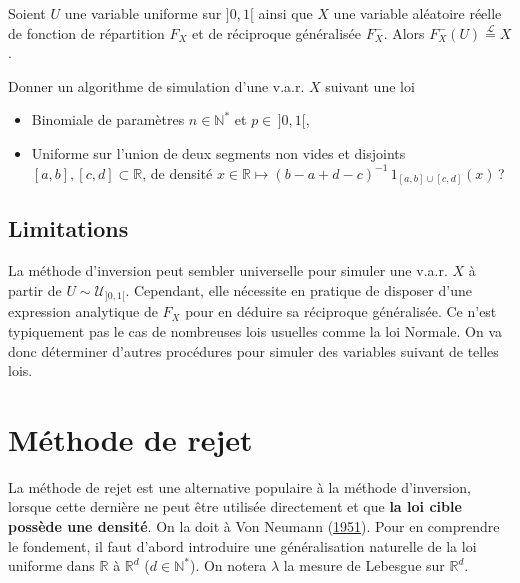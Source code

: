 \begin{theoreme}\label{V-invgen}

Soient \(U\) une variable uniforme sur \(]0,1[\) ainsi que \(X\) une
variable aléatoire réelle de fonction de répartition \(F_X\) et de
réciproque généralisée \(F_X^-\). Alors
\(F_X^-(U) \overset{\mathcal{L}}{=} X\).
\end{theoreme}

\label{V-exemples2}
Donner un algorithme de simulation d'une v.a.r. \(X\) suivant une loi

\begin{itemize}
\tightlist
\item
  Binomiale de paramètres \(n\in\mathbb{N}^\ast\) et \(p \in\, ]0,1[\),
\item
  Uniforme sur l'union de deux segments non vides et disjoints
  \([a,b], [c,d]\subset\mathbb{R}\), de densité
  \(x\in\mathbb{R}\mapsto (b-a + d-c)^{-1}\,1_{[a,b]\cup[c,d]}(x)\)\,?
\end{itemize}


\subsection{Limitations}\label{V-limitations}

La méthode d'inversion peut sembler universelle pour simuler une v.a.r.
\(X\) à partir de \(U \sim \mathcal{U}_{]0,1[}\). Cependant, elle
nécessite en pratique de disposer d'une expression analytique de \(F_X\)
pour en déduire sa réciproque généralisée. Ce n'est typiquement pas le
cas de nombreuses lois usuelles comme la loi Normale. On va donc
déterminer d'autres procédures pour simuler des variables suivant de
telles lois.

\section{Méthode de rejet}\label{V-muxe9thode-de-rejet}

La méthode de rejet est une alternative populaire à la méthode
d'inversion, lorsque cette dernière ne peut être utilisée directement et
que \textbf{la loi cible possède une densité}. On la doit à Von Neumann
(\protect\hyperlink{refV-vonNeumann}{1951}). Pour en comprendre le
fondement, il faut d'abord introduire une généralisation naturelle de la
loi uniforme dans \(\mathbb{R}\) à \(\mathbb{R}^d\)
(\(d\in\mathbb{N}^\ast\)). On notera \(\lambda\) la mesure de Lebesgue
sur \(\mathbb{R}^d\).

